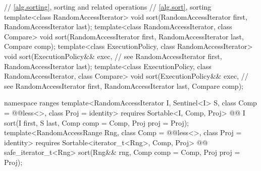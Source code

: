 \begin{codeblock}
  // \ref{alg.sorting}, sorting and related operations
  // \ref{alg.sort}, sorting
  template<class RandomAccessIterator>
    void sort(RandomAccessIterator first, RandomAccessIterator last);
  template<class RandomAccessIterator, class Compare>
    void sort(RandomAccessIterator first, RandomAccessIterator last,
              Compare comp);
  template<class ExecutionPolicy, class RandomAccessIterator>
    void sort(ExecutionPolicy&& exec, // see 
              RandomAccessIterator first, RandomAccessIterator last);
  template<class ExecutionPolicy, class RandomAccessIterator, class Compare>
    void sort(ExecutionPolicy&& exec, // see 
              RandomAccessIterator first, RandomAccessIterator last,
              Compare comp);
\end{codeblock}\begin{addedblock}\begin{codeblock}
  namespace ranges {
    template<RandomAccessIterator I, Sentinel<I> S, class Comp = @@less<>,
        class Proj = identity>
      requires Sortable<I, Comp, Proj>
      @@ I
        sort(I first, S last, Comp comp = Comp{}, Proj proj = Proj{});
    template<RandomAccessRange Rng, class Comp = @@less<>, class Proj = identity>
      requires Sortable<iterator_t<Rng>, Comp, Proj>
      @@ safe_iterator_t<Rng>
        sort(Rng&& rng, Comp comp = Comp{}, Proj proj = Proj{});
  }
\end{codeblock}\end{addedblock}\begin{codeblock}


\end{codeblock}
